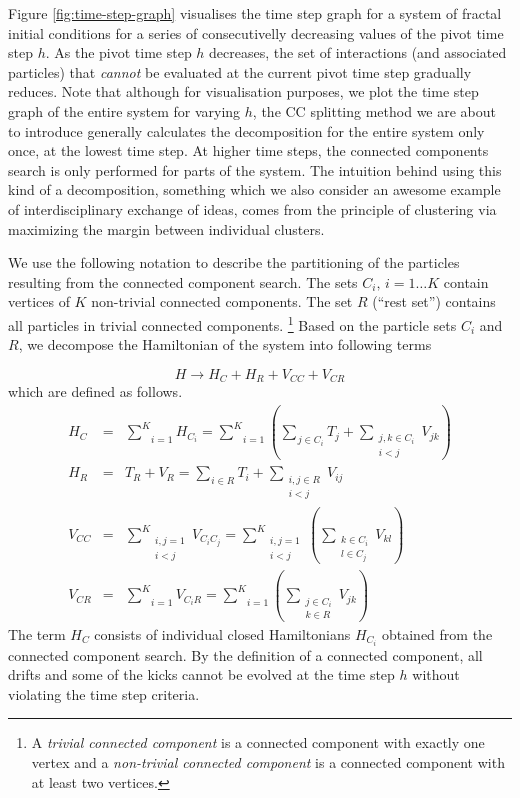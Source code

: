 \documentclass[referee]{aa}
\begin{document}
Figure \ref{fig:time-step-graph} visualises the time step graph for
a system of fractal initial conditions for a series of consecutivelly
decreasing values of the pivot time step $h$. As the pivot time step
$h$ decreases, the set of interactions (and associated particles)
that \emph{cannot} be evaluated at the current pivot time step gradually
reduces. Note that although for visualisation purposes, we plot the
time step graph of the entire system for varying $h$, the CC splitting
method we are about to introduce generally calculates the decomposition
for the entire system only once, at the lowest time step. At higher
time steps, the connected components search is only performed for
parts of the system. The intuition behind using this kind of a decomposition,
something which we also consider an awesome example of interdisciplinary
exchange of ideas, comes from the principle of clustering via maximizing
the margin between individual clusters.\cite{Duan:2009kh}

We use the following notation to describe the partitioning of the
particles resulting from the connected component search. The sets
$C_{i},\, i=1\ldots K$ contain vertices of $K$ non-trivial connected
components. The set $R$ (``rest set'') contains all particles in
trivial connected components.%
\footnote{A \emph{trivial connected component} is a connected component with
exactly one vertex and a \emph{non-trivial connected component} is
a connected component with at least two vertices.%
} Based on the particle sets $C_{i}$ and $R$, we decompose the Hamiltonian
of the system into following terms

\[
H\rightarrow H_{C}+H_{R}+V_{CC}+V_{CR}
\]
which are defined as follows.
\begin{eqnarray*}
H_{C} & = & \underset{i=1}{\overset{K}{\sum}}H_{C_{i}}=\underset{i=1}{\overset{K}{\sum}}\left(\underset{j\in C_{i}}{\overset{}{\sum}}T_{j}+\underset{\substack{j,k\in C_{i}\\
i<j
}
}{\overset{}{\sum}}V_{jk}\right)\\
H_{R} & = & T_{R}+V_{R}=\underset{i\in R}{\overset{}{\sum}}T_{i}+\underset{\substack{i,j\in R\\
i<j
}
}{\overset{}{\sum}}V_{ij}\\
V_{CC} & = & \underset{\substack{i,j=1\\
i<j
}
}{\overset{K}{\sum}}V_{C_{i}C_{j}}=\underset{\substack{i,j=1\\
i<j
}
}{\overset{K}{\sum}}\left(\underset{\substack{k\in C_{i}\\
l\in C_{j}
}
}{\overset{}{\sum}}V_{kl}\right)\\
V_{CR} & = & \underset{i=1}{\overset{K}{\sum}}V_{C_{i}R}=\underset{i=1}{\overset{K}{\sum}}\left(\underset{\substack{j\in C_{i}\\
k\in R
}
}{\overset{}{\sum}}V_{jk}\right)
\end{eqnarray*}
The term $H_{C}$ consists of individual closed Hamiltonians $H_{C_{i}}$
obtained from the connected component search. By the definition of
a connected component, all drifts and some of the kicks cannot be
evolved at the time step $h$ without violating the time step criteria.
\end{document}
